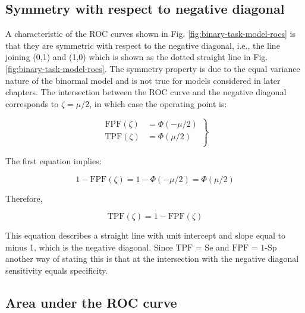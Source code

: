 \documentclass[
]{book}
\begin{document}
\hypertarget{binary-task-model-symmetry-wrt-negative-diagonal}{%
\subsection{Symmetry with respect to negative diagonal}\label{binary-task-model-symmetry-wrt-negative-diagonal}}

A characteristic of the ROC curves shown in Fig. \ref{fig:binary-task-model-rocs} is that they are symmetric with respect to the negative diagonal, i.e., the line joining (0,1) and (1,0) which is shown as the dotted straight line in Fig. \ref{fig:binary-task-model-rocs}. The symmetry property is due to the equal variance nature of the binormal model and is not true for models considered in later chapters. The intersection between the ROC curve and the negative diagonal corresponds to \(\zeta = \mu/2\), in which case the operating point is:

\begin{equation} 
\left.
\begin{aligned}  
\text{FPF}\left ( \zeta \right ) &=\Phi\left ( -\mu/2 \right )\\
\text{TPF}\left ( \zeta \right ) &=\Phi\left (\mu/2 \right )\\ 
\end{aligned}
\right \}
\label{eq:binary-task-model-neg-diag}
\end{equation}

The first equation implies:

\[1-\text{FPF}\left ( \zeta \right ) =1-\Phi\left ( -\mu/2 \right )= \Phi\left ( \mu/2 \right )\]

Therefore,

\begin{equation} 
\text{TPF}\left ( \zeta \right ) = 1-\text{FPF}\left ( \zeta \right )
\label{eq:binary-task-model-neg-diag2}
\end{equation}

This equation describes a straight line with unit intercept and slope equal to minus 1, which is the negative diagonal. Since \(\text{TPF = Se}\) and \(\text{FPF = 1-Sp}\) another way of stating this is that at the intersection with the negative diagonal sensitivity equals specificity.

\hypertarget{binary-task-model-auc-roc-important}{%
\subsection{Area under the ROC curve}\label{binary-task-model-auc-roc-important}}
\end{document}

